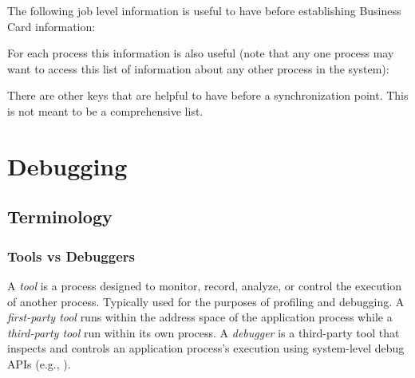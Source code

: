 {\large {}}

{\large {}}

{\large {}}


The following job level information is useful to have before establishing Business Card information:


For each process this information is also useful (note that any one process may want to access this list of information about any other process in the system):


There are other keys that are helpful to have before a synchronization point. This is not meant to be a comprehensive list.

\section{Debugging}
\label{app:uc-debugging}

\subsection{Terminology}

\subsubsection{Tools vs Debuggers}

A \textit{tool} is a process designed to monitor, record, analyze, or control the execution of another process.  Typically used for the purposes of profiling and debugging. A \textit{first-party tool} runs within the address space of the application process while a \textit{third-party tool} run within its own process.  A \textit{debugger} is a third-party tool that inspects and controls an application process's execution using system-level debug APIs (e.g., ).

